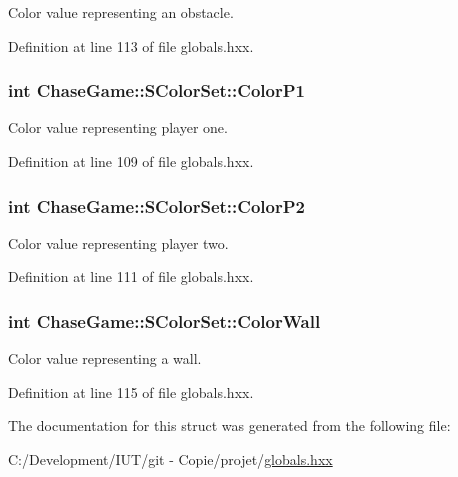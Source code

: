 Color value representing an obstacle. 



Definition at line 113 of file globals.\-hxx.

\hypertarget{struct_chase_game_1_1_s_color_set_a51e5a557359624fe92be93cb80621922}{
\subsubsection[{Color\-P1}]{\setlength{\rightskip}{0pt plus 5cm}int Chase\-Game\-::\-S\-Color\-Set\-::\-Color\-P1}}\label{struct_chase_game_1_1_s_color_set_a51e5a557359624fe92be93cb80621922}


Color value representing player one. 



Definition at line 109 of file globals.\-hxx.

\hypertarget{struct_chase_game_1_1_s_color_set_a777bce7519236b269ba44d921f54e4e8}{
\subsubsection[{Color\-P2}]{\setlength{\rightskip}{0pt plus 5cm}int Chase\-Game\-::\-S\-Color\-Set\-::\-Color\-P2}}\label{struct_chase_game_1_1_s_color_set_a777bce7519236b269ba44d921f54e4e8}


Color value representing player two. 



Definition at line 111 of file globals.\-hxx.

\hypertarget{struct_chase_game_1_1_s_color_set_a7a7a8dae118390ce5b4432aa4d99a474}{
\subsubsection[{Color\-Wall}]{\setlength{\rightskip}{0pt plus 5cm}int Chase\-Game\-::\-S\-Color\-Set\-::\-Color\-Wall}}\label{struct_chase_game_1_1_s_color_set_a7a7a8dae118390ce5b4432aa4d99a474}


Color value representing a wall. 



Definition at line 115 of file globals.\-hxx.



The documentation for this struct was generated from the following file\-:\begin{DoxyCompactItemize}
\item 
C\-:/\-Development/\-I\-U\-T/git -\/ Copie/projet/\hyperlink{globals_8hxx}{globals.\-hxx}\end{DoxyCompactItemize}
